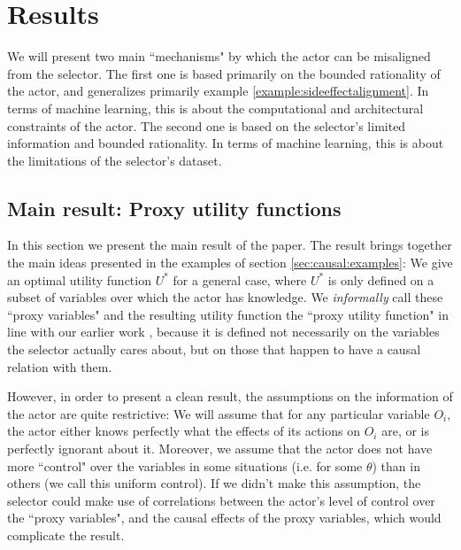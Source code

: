 \section{Results}

We will present two main ``mechanisms" by which the actor can be misaligned from the selector. The first one is based primarily on the bounded rationality of the actor, and generalizes primarily example \ref{example:sideeffectalignment}. In terms of machine learning, this is about the computational and architectural constraints of the actor. The second one is based on the selector's limited information and bounded rationality. In terms of machine learning, this is about the limitations of the selector's dataset.

 
\subsection{Main result: Proxy utility functions}\label{sec:mainresultproxy}
In this section we present the main result of the paper. The result brings together the main ideas presented in the examples of section \ref{sec:causal:examples}: We give an optimal utility function $U^*$ for a general case, where $U^*$ is only defined on a subset of variables over which the actor has knowledge. We \textit{informally} call these ``proxy variables" and the resulting utility function the ``proxy utility function" in line with our earlier work \citep{Hubinger2019}, because it is defined not necessarily on the variables the selector actually cares about, but on those that happen to have a causal relation with them. 

However, in order to present a clean result, the assumptions on the information of the actor are quite restrictive: We will assume that for any particular variable $O_i$, the actor either knows perfectly what the effects of its actions on $O_i$ are, or is perfectly ignorant about it. Moreover, we assume that the actor does not have more ``control" over the variables in some situations (i.e. for some $\theta$) than in others (we call this uniform control). If we didn't make this assumption, the selector could make use of correlations between the actor's level of control over the ``proxy variables", and the causal effects of the proxy variables, which would complicate the result. 


